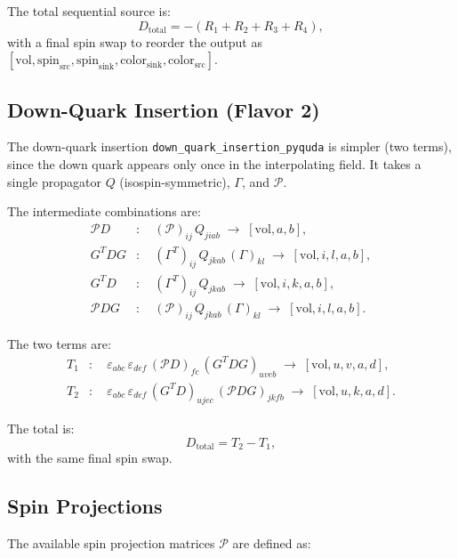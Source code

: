 \documentclass[11pt,a4paper]{article}
\newcommand{\eps}{\varepsilon}
\begin{document}
The total sequential source is:
\begin{equation}
  D_{\text{total}} = -(R_1 + R_2 + R_3 + R_4),
\end{equation}
with a final spin swap to reorder the output as
$[\mathrm{vol}, \mathrm{spin}_{\text{src}}, \mathrm{spin}_{\text{sink}},
  \mathrm{color}_{\text{sink}}, \mathrm{color}_{\text{src}}]$.

\subsection{Down-Quark Insertion (Flavor 2)}

The down-quark insertion \texttt{down\_quark\_insertion\_pyquda} is simpler (two
terms), since the down quark appears only once in the interpolating field. It takes a
single propagator $Q$ (isospin-symmetric), $\Gamma$, and $\mathcal{P}$.

The intermediate combinations are:
\begin{align}
  \mathcal{P} D &: \quad (\mathcal{P})_{ij}\, Q_{jiab}
    \;\to\; [\mathrm{vol}, a, b], \\
  G^T D G &: \quad (\Gamma^T)_{ij}\, Q_{jkab}\, (\Gamma)_{kl}
    \;\to\; [\mathrm{vol}, i, l, a, b], \\
  G^T D &: \quad (\Gamma^T)_{ij}\, Q_{jkab}
    \;\to\; [\mathrm{vol}, i, k, a, b], \\
  \mathcal{P} D G &: \quad (\mathcal{P})_{ij}\, Q_{jkab}\, (\Gamma)_{kl}
    \;\to\; [\mathrm{vol}, i, l, a, b].
\end{align}

The two terms are:
\begin{align}
  T_1 &: \quad
    \eps_{abc}\,\eps_{def}\,
    (\mathcal{P} D)_{fc}\, (G^T D G)_{uveb}
    \;\to\; [\mathrm{vol}, u, v, a, d], \\[4pt]
  T_2 &: \quad
    \eps_{abc}\,\eps_{def}\,
    (G^T D)_{ujec}\, (\mathcal{P} D G)_{jkfb}
    \;\to\; [\mathrm{vol}, u, k, a, d].
\end{align}

The total is:
\begin{equation}
  D_{\text{total}} = T_2 - T_1,
\end{equation}
with the same final spin swap.

\subsection{Spin Projections}

The available spin projection matrices $\mathcal{P}$ are defined as:
\end{document}
